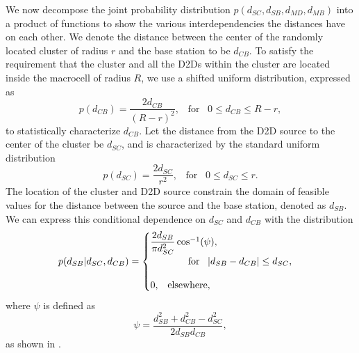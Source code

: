 \documentclass[10pt, final, journal, letterpaper,oneside, twocolumn]{IEEEtran}
\begin{document}
We now decompose the joint probability distribution $p(d_{SC},d_{SB},d_{MD},d_{MB})$ into a product of functions to show the various interdependencies the distances have on each other.  We denote the distance between the center of the randomly located cluster of radius $r$ and the base station to be $d_{CB}$.  To satisfy the requirement that the cluster and all the D2Ds within the cluster are located inside the macrocell of radius $R$, we use a shifted uniform distribution, expressed as
\begin{equation} 
p(d_{CB}) = \dfrac{2d_{CB}}{(R-r)^2}, \;\;\; \text{for} \;\;\; 0\leq d_{CB} \leq R-r, 
\label{eq:dcb}
\end{equation}
to statistically characterize $d_{CB}$.  Let the distance from the D2D source to the center of the cluster be $d_{SC}$, and is characterized by the standard uniform distribution
\begin{equation} 
p(d_{SC}) = \dfrac{2d_{SC}}{r^2}, \;\;\; \text{for} \;\;\; 0\leq d_{SC} \leq r. 
\label{eq:dsc}
\end{equation} 
The location of the cluster and D2D source constrain the domain of feasible values for the distance between the source and the base station, denoted as $d_{SB}$.  We can express this conditional dependence on $d_{SC}$ and $d_{CB}$ with the distribution
\begin{equation} 
p(d_{SB}|d_{SC},d_{CB}) = 
\begin{cases}
\dfrac{2d_{SB}}{\pi d_{SC}^2} \cos^{-1}(\psi), 
\\
\;\;\;\;\;\;\;\;\;\;\;\;\;\;\text{for} \;\;\; |d_{SB} - d_{CB}|\leq d_{SC},
\vspace{10pt}
\\
0, \;\;\; \text{elsewhere},
\end{cases}
\label{eq:m3_D_pdf}
\end{equation}
where $\psi$ is defined as
\begin{equation}
\psi = \dfrac{d_{SB}^2+d_{CB}^2-d_{SC}^2}{2d_{SB}d_{CB}},
\label{eq:dsb}
\end{equation}
as shown in \cite{geometry_prob}.
\end{document}
